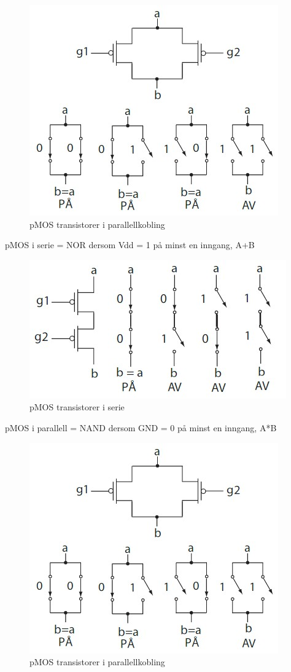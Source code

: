 \documentclass{article}
\begin{document}
	\begin{figure}[H]
		\includegraphics[scale = 0.6]{pMOSpara.jpg}
		\caption{pMOS transistorer i parallellkobling}
	\end{figure}
	
	pMOS i serie = NOR dersom Vdd = 1 på minst en inngang, A+B
	
	\begin{figure}[H]
		\includegraphics[scale = 0.6]{pMOSserie.jpg}
		\caption{pMOS transistorer i serie}
	\end{figure}
	
	pMOS i parallell = NAND dersom GND = 0 på minst en inngang, A*B
	
	\begin{figure}[H]
		\includegraphics[scale = 0.6]{pMOSpara.jpg}
		\caption{pMOS transistorer i parallellkobling}
	\end{figure}
	
\end{document}

